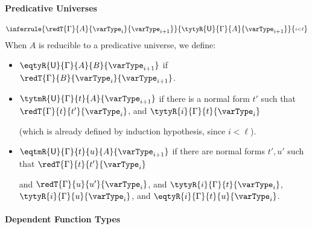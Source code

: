 \paragraph{Predicative Universes}
\[
{\small
  \inferrule{\redT{\Gamma}{A}{\varType_i{}}{\varType_{i+1}}}
            {\tytyR{\mathsf{U}}{\Gamma}{A}{\varType_{i+1}}}
            { \substack{i < \ell}}
}\]
When $A$ is reducible to a predicative universe, we define:
\begin{itemize}
  \item \( \eqtyR{\mathsf{U}}{\Gamma}{A}{B}{\varType_{i+1}} \) if \( \redT{\Gamma}{B}{\varType_i{}}{\varType_{i+1}} \).
  \item \( \tytmR{\mathsf{U}}{\Gamma}{t}{A}{\varType_{i+1}} \) if there is a normal form \( t' \) such that
    \( \redT{\Gamma}{t}{t'}{\varType_i{}} \), and \( \tytyR{i}{\Gamma}{t}{\varType_i} \)

    (which is already defined by induction hypothesis, since
    \( i < \ell \)).
  \item \( \eqtmR{\mathsf{U}}{\Gamma}{t}{u}{A}{\varType_{i+1}} \) if there are normal forms \( t', u' \) such that
    \( \redT{\Gamma}{t}{t'}{\varType_i{}} \)

    and \( \redT{\Gamma}{u}{u'}{\varType_i{}} \), and
    \( \tytyR{i}{\Gamma}{t}{\varType_i} \), \( \tytyR{i}{\Gamma}{u}{\varType_i} \), and \( \eqtyR{i}{\Gamma}{t}{u}{\varType_i} \).
\end{itemize}



\paragraph{Dependent Function Types}

